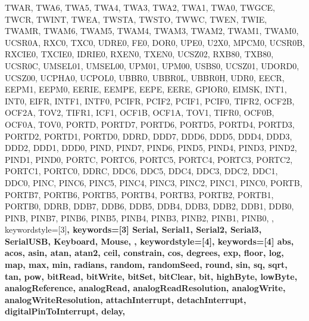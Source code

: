 {{                TWAR, TWA6, TWA5, TWA4, TWA3, TWA2, TWA1, TWA0, TWGCE,
                TWCR, TWINT, TWEA, TWSTA, TWSTO, TWWC, TWEN, TWIE,
                TWAMR, TWAM6, TWAM5, TWAM4, TWAM3, TWAM2, TWAM1, TWAM0,
                UCSR0A, RXC0, TXC0, UDRE0, FE0, DOR0, UPE0, U2X0, MPCM0,
                UCSR0B, RXCIE0, TXCIE0, IDRIE0, RXEN0, TXEN0, UCSZ02, RXB80, TXB80,
                UCSR0C, UMSEL01, UMSEL00, UPM01, UPM00, USBS0, UCSZ01, UDORD0, UCSZ00, UCPHA0, UCPOL0,
                UBBR0, UBBR0L, UBBR0H,
                UDR0,
                EECR, EEPM1, EEPM0, EERIE, EEMPE, EEPE, EERE,
                GPIOR0,
                EIMSK, INT1, INT0,
                EIFR, INTF1, INTF0,
                PCIFR, PCIF2, PCIF1, PCIF0,
                TIFR2, OCF2B, OCF2A, TOV2, 
                TIFR1, ICF1, OCF1B, OCF1A, TOV1, 
                TIFR0, OCF0B, OCF0A, TOV0, 
                PORTD, PORTD7, PORTD6, PORTD5, PORTD4, PORTD3, PORTD2, PORTD1, PORTD0, 
                DDRD, DDD7, DDD6, DDD5, DDD4, DDD3, DDD2, DDD1, DDD0, 
                PIND, PIND7, PIND6, PIND5, PIND4, PIND3, PIND2, PIND1, PIND0, 
                PORTC, PORTC6, PORTC5, PORTC4, PORTC3, PORTC2, PORTC1, PORTC0, 
                DDRC, DDC6, DDC5, DDC4, DDC3, DDC2, DDC1, DDC0, 
                PINC, PINC6, PINC5, PINC4, PINC3, PINC2, PINC1, PINC0, 
                PORTB, PORTB7, PORTB6, PORTB5, PORTB4, PORTB3, PORTB2, PORTB1, PORTB0, 
                DDRB, DDB7, DDB6, DDB5, DDB4, DDB3, DDB2, DDB1, DDB0, 
                PINB, PINB7, PINB6, PINB5, PINB4, PINB3, PINB2, PINB1, PINB0, 
                },  
% 
%
  keywordstyle=[3]\bfseries\color{arduinoOrange},
  keywords=[3]{  %
                Serial, Serial1, Serial2, Serial3, SerialUSB, Keyboard, Mouse,
                },      
%
%
  keywordstyle=[4]\color{arduinoOrange},
  keywords=[4]{  %
                abs, acos, asin, atan, atan2, ceil, constrain, cos, degrees, exp, 
                floor, log, map, max, min, radians, random, randomSeed, round, sin, 
                sq, sqrt, tan, pow, bitRead, bitWrite, bitSet, bitClear, bit, 
                highByte, lowByte, analogReference, analogRead, 
                analogReadResolution, analogWrite, analogWriteResolution, 
                attachInterrupt, detachInterrupt, digitalPinToInterrupt, delay, 
}}
